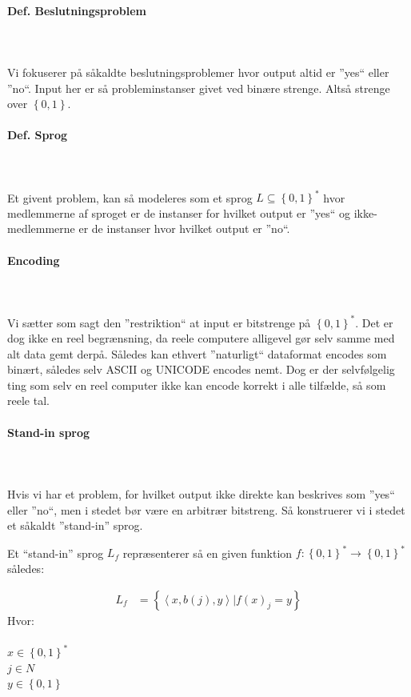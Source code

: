 \paragraph{Def. Beslutningsproblem}
~\\
~\\
Vi fokuserer på såkaldte beslutningsproblemer hvor output altid er ''yes`` eller ''no``. Input her er så probleminstanser givet ved binære strenge. Altså strenge over $\left\lbrace 0,1 \right\rbrace$.

\paragraph{Def. Sprog}
~\\
~\\
Et givent problem, kan så modeleres som et sprog $L \subseteq \left\lbrace 0,1 \right\rbrace^*$ hvor medlemmerne af sproget er de instanser for hvilket output er ''yes`` og ikke-medlemmerne er de instanser hvor hvilket output er ''no``.

\paragraph{Encoding}
~\\
~\\
Vi sætter som sagt den ''restriktion`` at input er bitstrenge på $\left\lbrace 0,1 \right\rbrace^*$. Det er dog ikke en reel begrænsning, da reele computere alligevel gør selv samme med alt data gemt derpå. Således kan ethvert ''naturligt`` dataformat encodes som binært, således selv ASCII og UNICODE encodes nemt.
Dog er der selvfølgelig ting som selv en reel computer ikke kan encode korrekt i alle tilfælde, så som reele tal.

\paragraph{Stand-in sprog}
~\\
~\\
Hvis vi har et problem, for hvilket output ikke direkte kan beskrives som ''yes`` eller ''no``, men i stedet bør være en arbitrær bitstreng. Så konstruerer vi i stedet et såkaldt ''stand-in'' sprog. 

Et ``stand-in'' sprog $L_f$ repræsenterer så en given funktion $f: \left\lbrace 0,1 \right\rbrace^* \rightarrow \left\lbrace 0,1 \right\rbrace^*$ således:

\begin{align*}
 L_f &= \left\lbrace \left\langle x, b(j), y \right\rangle | f(x)_j = y \right\rbrace
\end{align*}
Hvor:\\
~\\
$x \in \left\lbrace 0,1 \right\rbrace^*$ \\
$j \in N$ \\
$y \in \left\lbrace 0,1 \right\rbrace$ \\

